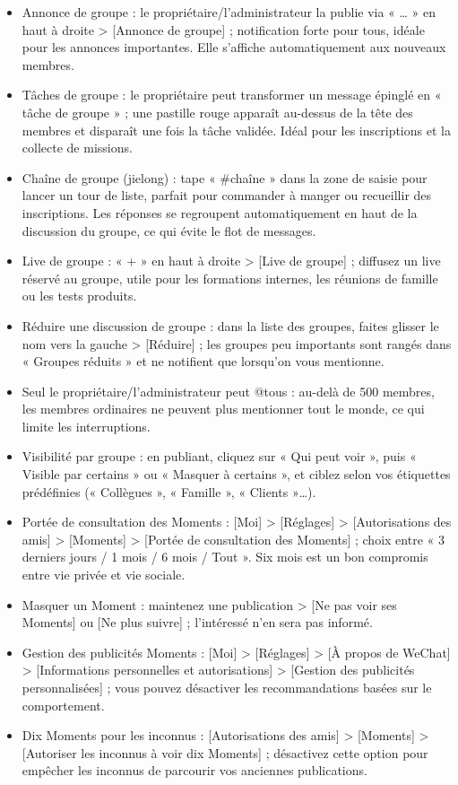 \begin{itemize}
  \item Annonce de groupe : le propriétaire/l'administrateur la publie via « … » en haut à droite > [Annonce de groupe] ; notification forte pour tous, idéale pour les annonces importantes. Elle s'affiche automatiquement aux nouveaux membres.
  \item Tâches de groupe : le propriétaire peut transformer un message épinglé en « tâche de groupe » ; une pastille rouge apparaît au-dessus de la tête des membres et disparaît une fois la tâche validée. Idéal pour les inscriptions et la collecte de missions.
  \item Chaîne de groupe (jielong) : tape « \#chaîne » dans la zone de saisie pour lancer un tour de liste, parfait pour commander à manger ou recueillir des inscriptions. Les réponses se regroupent automatiquement en haut de la discussion du groupe, ce qui évite le flot de messages.
  \item Live de groupe : « + » en haut à droite > [Live de groupe] ; diffusez un live réservé au groupe, utile pour les formations internes, les réunions de famille ou les tests produits.
  \item Réduire une discussion de groupe : dans la liste des groupes, faites glisser le nom vers la gauche > [Réduire] ; les groupes peu importants sont rangés dans « Groupes réduits » et ne notifient que lorsqu'on vous mentionne.
  \item Seul le propriétaire/l'administrateur peut @tous : au-delà de 500 membres, les membres ordinaires ne peuvent plus mentionner tout le monde, ce qui limite les interruptions.
\end{itemize}


\begin{itemize}
  \item Visibilité par groupe : en publiant, cliquez sur « Qui peut voir », puis « Visible par certains » ou « Masquer à certains », et ciblez selon vos étiquettes prédéfinies (« Collègues », « Famille », « Clients »…).
  \item Portée de consultation des Moments : [Moi] > [Réglages] > [Autorisations des amis] > [Moments] > [Portée de consultation des Moments] ; choix entre « 3 derniers jours / 1 mois / 6 mois / Tout ». Six mois est un bon compromis entre vie privée et vie sociale.
  \item Masquer un Moment : maintenez une publication > [Ne pas voir ses Moments] ou [Ne plus suivre] ; l'intéressé n'en sera pas informé.
  \item Gestion des publicités Moments : [Moi] > [Réglages] > [À propos de WeChat] > [Informations personnelles et autorisations] > [Gestion des publicités personnalisées] ; vous pouvez désactiver les recommandations basées sur le comportement.
  \item Dix Moments pour les inconnus : [Autorisations des amis] > [Moments] > [Autoriser les inconnus à voir dix Moments] ; désactivez cette option pour empêcher les inconnus de parcourir vos anciennes publications.
\end{itemize}

